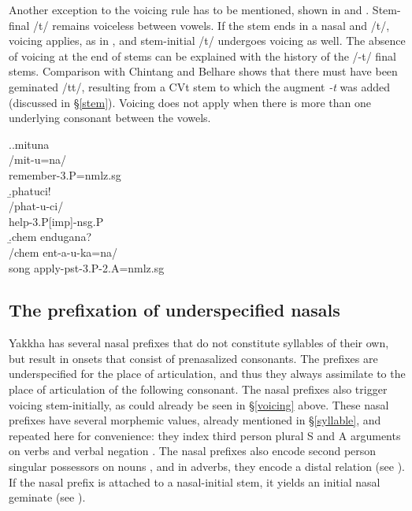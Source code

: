 Another exception to the voicing rule has to be mentioned, shown in \Next[a] and \Next[b]. Stem-final /t/ remains voiceless between vowels. If the stem ends in a nasal and /t/, voicing applies, as in \Next[c], and stem-initial /t/ undergoes voicing as well. The absence of voicing at the end of stems can be explained with the history of the  /-t/ final stems. Comparison with Chintang and Belhare \citep{Bickel2003Belhare, Bickeletal2007Free} shows that there must have been geminated /tt/, resulting from a CVt stem to which the augment \emph{-t} was added (discussed in §\ref{stem}). Voicing does not apply when there is more than one underlying consonant between the vowels. 
			
			\ex.\a.\glll mituna\\
			/mit-u=na/\\
			remember{\sc [pst]-3.P=nmlz.sg}\\
			\b.\glll  phatuci!\\
			/phat-u-ci/\\
			help{\sc -3.P[imp]-nsg.P}\\
			\b.\glll chem endugana?\\
			/chem ent-a-u-ka=na/\\
			song apply{\sc -pst-3.P-2.A=nmlz.sg}\\
	 
	 
\subsection{The prefixation of underspecified nasals}\label{nas-pref}		 
		 
Yakkha has several nasal prefixes that do not constitute  syllables of their own, but result in onsets that consist of prenasalized consonants. The prefixes are underspecified for the place of articulation, and thus they always assimilate to the place of articulation of the following consonant. The nasal prefixes also trigger voicing stem-initially, as could already be seen in §\ref{voicing} above. These nasal prefixes have several morphemic values, already mentioned in §\ref{syllable}, and repeated here for convenience: they index third person plural S and A arguments on verbs \Next[a] and verbal negation \Next[b]. The nasal prefixes also encode second person singular possessors on nouns \Next[c], and in adverbs, they encode a distal relation (see \Next[d]). If the nasal prefix is attached to a nasal-initial stem, it yields an initial nasal geminate (see \NNext).
 
